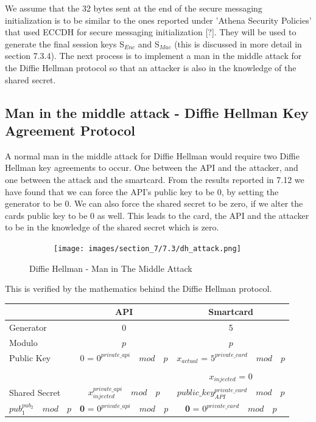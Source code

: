 \documentclass[bsc,frontabs,twoside,singlespacing,parskip,deptreport]{infthesis}     %
\begin{document}
We assume that the 32 bytes sent at the end of the secure messaging initialization is to be similar to the ones reported under 'Athena Security Policies' that used ECCDH for secure messaging initialization [?]. They will be used to generate the final session keys S$_{Enc}$ and S$_{Mac}$ (this is discussed in more detail in section 7.3.4). The next process is to implement a man in the middle attack for the Diffie Hellman protocol so that an attacker is also in the knowledge of the shared secret.

\subsection{Man in the middle attack - Diffie Hellman Key Agreement Protocol}
A normal man in the middle attack for Diffie Hellman would require two Diffie Hellman key agreements to occur. One between the API and the attacker, and one between the attack and the smartcard. From the results reported in 7.12 we have found that we can force the API's public key to be 0, by setting the generator to be 0. We can also force the shared secret to be zero, if we alter the cards public key to be 0 as well. This leads to the card, the API and the attacker to be in the knowledge of the shared secret which is zero. 

\begin{figure}[H]
\centering
\begin{subfigure}{1\textwidth}
  \texttt{[image: images/section\_7/7.3/dh\_attack.png]}
\end{subfigure}
\caption{Diffie Hellman - Man in The Middle Attack}
\end{figure}

This is verified by the mathematics behind the Diffie Hellman protocol.

\begin{table}[H]
\begin{tabular}{|l|c|c|}
\hline
 & API & Smartcard\\
\hline
Generator & 0 & 5\\
\hline
Modulo & $p$ & $p$ \\
\hline
Public Key & 0 = $0^{private\_api} \quad mod \quad p$  & $x_{actual}$ = $5^{private\_card} \quad mod \quad p$\\
 & & \\
 & & $x_{injected}$ = 0\\
\hline
Shared Secret & $x_{injected}^{private\_api} \quad mod \quad p$ & $ public\_key_{API}^{private\_card} \quad mod \quad p$ \\
$pub_1^{pub_2} \quad mod \quad p$ & \textbf{0} = $0^{private\_api} \quad mod \quad p$ &\textbf{0} = $0^{private\_card} \quad mod \quad p$\\
\hline
\end{tabular}
\end{table}
\end{document}
